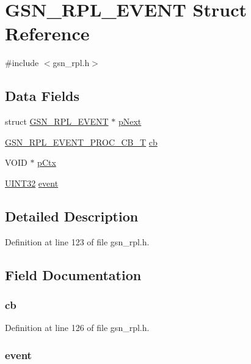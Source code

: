 \hypertarget{a00200}{
\section{GSN\_\-RPL\_\-EVENT Struct Reference}
\label{a00200}
}


{\ttfamily \#include $<$gsn\_\-rpl.h$>$}

\subsection*{Data Fields}
\begin{DoxyCompactItemize}
\item 
struct \hyperlink{a00200}{GSN\_\-RPL\_\-EVENT} $\ast$ \hyperlink{a00200_af25185f81ec5a082d348c68e7c233c06}{pNext}
\item 
\hyperlink{a00579_ad5cea0d221a0fad0b30b4a9e075a12ed}{GSN\_\-RPL\_\-EVENT\_\-PROC\_\-CB\_\-T} \hyperlink{a00200_acf618b61bbc2468a61156daa77b61ddb}{cb}
\item 
VOID $\ast$ \hyperlink{a00200_a5ef049defd7cc5565bb3c81588802ef7}{pCtx}
\item 
\hyperlink{a00660_gae1e6edbbc26d6fbc71a90190d0266018}{UINT32} \hyperlink{a00200_a62ef57f8dfa7ce1e8577994709b26c04}{event}
\end{DoxyCompactItemize}


\subsection{Detailed Description}


Definition at line 123 of file gsn\_\-rpl.h.



\subsection{Field Documentation}
\hypertarget{a00200_acf618b61bbc2468a61156daa77b61ddb}{
\subsubsection[{cb}]{ {\bf cb}}}
\label{a00200_acf618b61bbc2468a61156daa77b61ddb}


Definition at line 126 of file gsn\_\-rpl.h.

\hypertarget{a00200_a62ef57f8dfa7ce1e8577994709b26c04}{
\subsubsection[{event}]{ {\bf event}}}
\label{a00200_a62ef57f8dfa7ce1e8577994709b26c04}


